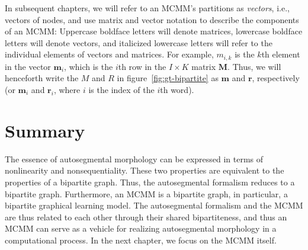 In subsequent chapters, we will refer to an MCMM's partitions as
\emph{vectors}, i.e., vectors of nodes, and use matrix and vector notation to
describe the components of an MCMM:
Uppercase boldface letters will denote matrices, %
lowercase boldface letters will denote vectors,
and italicized lowercase letters will refer to the individual elements
of vectors and matrices. %
For example, $m_{i,k}$ is the $k$th  %
element in the vector
$\mathbf{m}_i$, which is the $i$th
row in the $I \times K$ matrix
$\mathbf{M}$. Thus, we will henceforth write the $M$ and $R$ in
figure~\ref{fig:gt-bipartite} as $\mathbf{m}$ and $\mathbf{r}$,
respectively (or $\mathbf{m}_i$ and $\mathbf{r}_i$, where $i$ is the
index of the $i$th
word).

\section{Summary}\label{sec:graph-concl}
The essence of autosegmental morphology can be expressed in terms of nonlinearity
and nonsequentiality. These two properties are equivalent to the properties of a bipartite graph. Thus, the autosegmental formalism
reduces to a bipartite graph. %
Furthermore, an MCMM is a bipartite graph, in particular, a bipartite graphical learning model. The autosegmental formalism and the MCMM are thus related to
each other through their shared bipartiteness, and thus an MCMM can serve as a vehicle for realizing autosegmental morphology in a computational process. In the next chapter, we focus on the MCMM itself.
